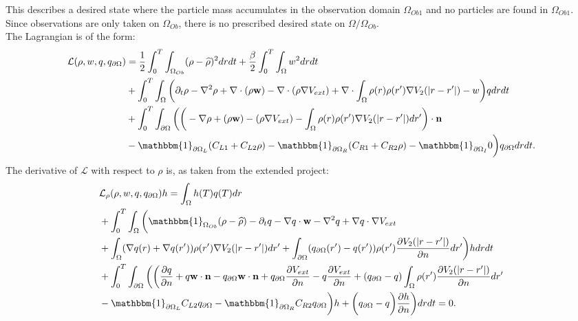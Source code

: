 This describes a desired state where the particle mass accumulates in the observation domain $\Omega_{Ob1}$ and no particles are found in $\Omega_{Ob1}$. Since observations are only taken on $\Omega_{Ob}$, there is no prescribed desired state on $\Omega / \Omega_{Ob}$.\\
The Lagrangian is of the form:
\begin{align*}
\mathcal{L}(\Sta,w,\Adjb,\Adjc ) &=\frac{1}{2} \int_0^T \int_{\Omega_{Ob}} (\Sta - \widehat \Sta)^2 dr dt + \frac{\beta}{2}\int_0^T \int_\Omega w^2 drdt \\
&+ \int_0^T \int_\Omega \bigg( \partial_t \rho - \nabla^2 \rho + \nabla \cdot (\rho \mathbf{w}) -\nabla \cdot (\rho \nabla V_{ext}) + \nabla \cdot \int_\Omega \rho(r) \rho(r') \nabla V_2(|r-r'|) -w \bigg) \Adjb dr dt\\
&+ \int_0^T \int_{\partial \Omega} \bigg(  \bigg(-\nabla \rho+ (\rho \mathbf{w}) -(\rho \nabla V_{ext}) -  \int_\Omega \rho(r) \rho(r') \nabla V_2(|r-r'|) dr' \bigg)\cdot \nor\\
&  -\mathbbm{1}_{\partial \Omega_L}( C_{L1}  + C_{L2}\Sta) -\mathbbm{1}_{\partial \Omega_R} ( C_{R1}  + C_{R2}\Sta) -\mathbbm{1}_{\partial \Omega_I} 0 \bigg) \Adjc dr dt.
\end{align*}
The derivative of $\mathcal{L}$ with respect to $\rho$ is, as taken from the extended project:
\begin{align*}
&\mathcal{L}_\rho (\rho,{w},\Adjb,\Adjc)h=
\int_\Omega h(T) \Adjb(T) dr\\
&+ \int_0^T \int_\Omega \bigg( \mathbbm{1}_{ \Omega_{Ob}} (\rho- \widehat{\rho})  - \partial_t \Adjb  - \nabla \Adjb \cdot \mathbf{w}  - \nabla^2 \Adjb \notag 
+  \nabla \Adjb \cdot \nabla V_{ext}  \notag \\
&+ \int_\Omega (\nabla  \Adjb(r)+\nabla  \Adjb(r')) \rho(r') \nabla V_2(|r-r'|) dr'+ \int_{\partial \Omega} ( \Adjc(r') - \Adjb(r')) \rho(r')   \frac{\partial V_2(|r-r'|)}{\partial n} dr' \bigg) h dr dt \\
&+  \int_0^T\int_{\partial \Omega}  \bigg(
\bigg(\frac{\partial \Adjb }{\partial n} + \Adjb  \mathbf{w} \cdot \mathbf{n} - \Adjc \mathbf{w} \cdot \mathbf{n}  +  \Adjc \dfrac{\partial V_{ext}}{\partial n} - \Adjb \frac{\partial V_{ext}}{\partial n} + ( \Adjc - \Adjb)  \int_\Omega \rho(r') \frac{\partial V_2(|r-r'|)}{\partial n} dr'\\
& -\mathbbm{1}_{\partial \Omega_L} C_{L2} \Adjc   -\mathbbm{1}_{\partial \Omega_R} C_{R2} \Adjc \bigg)h + \bigg( \Adjc- \Adjb \bigg) \frac{\partial h}{\partial n} \bigg) dr dt =0.
\end{align*}
